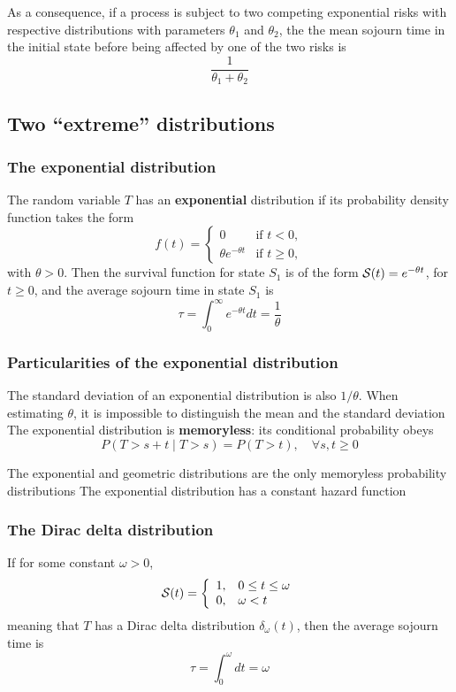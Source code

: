 \documentclass[aspectratio=169]{beamer}
\begin{document}
\begin{frame}
As a consequence, if a process is subject to two competing exponential risks with respective distributions with parameters $\theta_1$ and $\theta_2$, the the mean sojourn time in the initial state before being affected by one of the two risks is
$$
\frac{1}{\theta_1+\theta_2}
$$
\end{frame}


\subsection{Two ``extreme'' distributions}

\begin{frame}\frametitle{The exponential distribution}
The random variable $T$ has an \textbf{exponential} distribution if its
probability density function takes the form
\begin{equation}\label{eq:exp_distrib}
f(t)=\begin{cases}0&\textrm{if }t<0,\\
\theta e^{-\theta t}&\textrm{if }t\geq 0,
\end{cases}
\end{equation}
with $\theta>0$. Then the
survival function for state $S_1$ is of the form $\S(t)=e^{-\theta
  t}$, for $t\geq 0$, and the average sojourn time in state $S_1$ is
\[
\tau=\int_0^\infty e^{-\theta t}dt=\frac 1\theta
\]
\end{frame}

\begin{frame}\frametitle{Particularities of the exponential distribution}
The standard deviation of an exponential distribution is also $1/\theta$. When estimating $\theta$, it is impossible to distinguish the mean and the standard deviation
\vfill
The exponential distribution is \textbf{memoryless}: its conditional probability obeys
\[
P(T > s + t\; |\; T > s) = P(T > t),\quad\forall s, t \ge 0
\]

The exponential and geometric distributions are the only memoryless probability distributions
\vfill
The exponential distribution has a constant hazard function
\end{frame}

\begin{frame}\frametitle{The Dirac delta distribution}
If for some constant $\omega>0$,
\[
\S(t)=
\left\{
\begin{array}{ll}
1, & 0\leq t\leq\omega \\
0, & \omega<t
\end{array}
\right.
\]
meaning that $T$ has a Dirac delta distribution
$\delta_\omega(t)$, then the average sojourn time is
\[
\tau=\int_0^\omega dt=\omega
\]
\end{frame}
\end{document}
